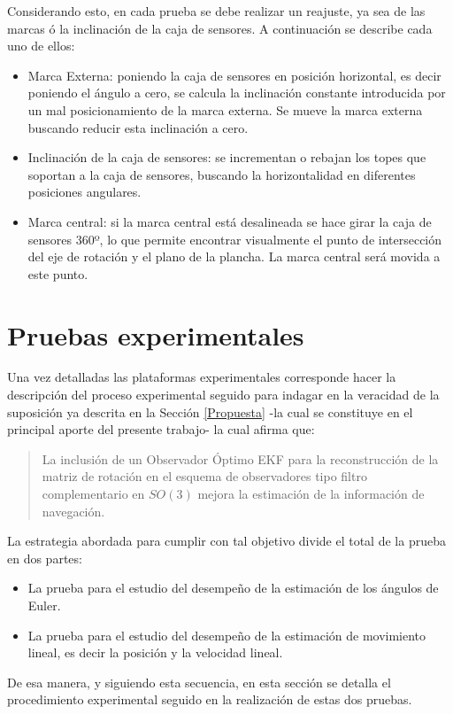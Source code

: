 \documentclass[10pt]{report}
\numberwithin{equation}{chapter}
\numberwithin{algorithm}{chapter}
\begin{document}
Considerando esto, en cada prueba se debe realizar un reajuste, ya sea de las marcas ó la inclinación de la caja de sensores. A continuación se describe cada uno de ellos:
\begin{itemize}
\item Marca Externa: poniendo la caja de sensores en posición horizontal, es decir poniendo el ángulo a cero, se calcula la inclinación constante introducida por un mal posicionamiento de la marca externa. Se mueve la marca externa buscando reducir esta inclinación a cero.
\item Inclinación de la caja de sensores: se incrementan o rebajan los topes que soportan a la caja de sensores, buscando la horizontalidad en diferentes posiciones angulares.
\item Marca central: si la marca central está desalineada se hace girar la caja de sensores 360º, lo que permite encontrar visualmente el punto de intersección del eje de rotación y el plano de la plancha. La marca central será movida a este punto.
\end{itemize}
\section{Pruebas experimentales}
Una vez detalladas las plataformas experimentales corresponde hacer la descripción del proceso experimental seguido para indagar en la veracidad de la suposición ya descrita en la Sección \ref{Propuesta} -la cual se constituye en el principal aporte del presente trabajo- la cual afirma que:
\begin{quote}
La inclusión de un Observador Óptimo EKF para la reconstrucción de la matriz de rotación en el esquema de observadores tipo filtro complementario en $SO(3)$ mejora la estimación de la información de navegación.
\end{quote}
La estrategia abordada para cumplir con tal objetivo divide el total de la prueba en dos partes:
\begin{itemize}
\item La prueba para el estudio del desempeño de la estimación de los ángulos de Euler.
\item La prueba para el estudio del desempeño de la estimación de movimiento lineal, es decir la posición y la velocidad lineal.
\end{itemize}
De esa manera, y siguiendo esta secuencia, en esta sección se detalla el procedimiento experimental seguido en la realización de estas dos pruebas.
\end{document}
